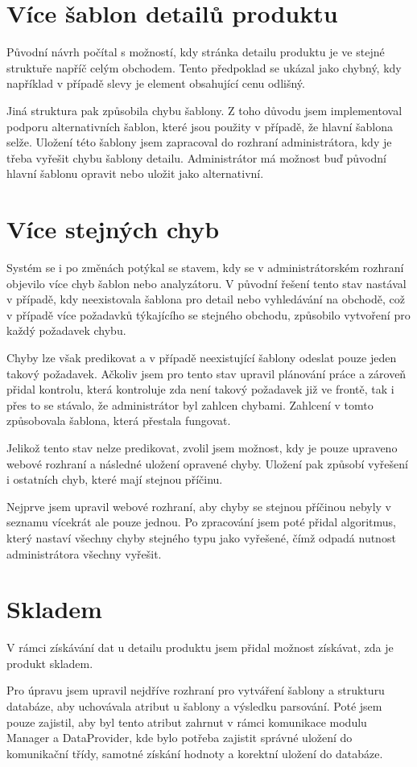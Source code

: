\documentclass[thesis=B,czech]{FITthesis}[2012/06/26]
\begin{document}
\section{Více šablon detailů produktu}
Původní návrh počítal s možností, kdy stránka detailu produktu je ve stejné struktuře napříč celým obchodem.
Tento předpoklad se ukázal jako chybný, kdy například v případě slevy je element obsahující cenu odlišný.
\par
Jiná struktura pak způsobila chybu šablony. Z toho důvodu jsem implementoval podporu alternativních šablon, které jsou
použity v případě, že hlavní šablona selže. Uložení této šablony jsem zapracoval do rozhraní administrátora, kdy je třeba
vyřešit chybu šablony detailu. Administrátor má možnost buď původní hlavní šablonu opravit nebo uložit jako alternativní.

\section{Více stejných chyb}
Systém se i po změnách potýkal se stavem, kdy se v administrátorském rozhraní objevilo více chyb šablon nebo analyzátoru.
V původní řešení tento stav nastával v případě, kdy neexistovala šablona pro detail nebo vyhledávání na obchodě, což v případě více požadavků
týkajícího se stejného obchodu, způsobilo vytvoření pro každý požadavek chybu.
\par
Chyby lze však predikovat a v případě neexistující šablony odeslat pouze jeden takový požadavek. Ačkoliv jsem pro tento 
stav upravil plánování práce a zároveň přidal kontrolu, která kontroluje zda není takový požadavek již ve frontě, tak
i přes to se stávalo, že administrátor byl zahlcen chybami. Zahlcení v tomto způsobovala šablona, která přestala fungovat.
\par
Jelikož tento stav nelze predikovat, zvolil jsem možnost, kdy je pouze upraveno webové rozhraní a následné uložení opravené chyby.
Uložení pak způsobí vyřešení i ostatních chyb, které mají stejnou příčinu.
\par
Nejprve jsem upravil webové rozhraní, aby chyby se stejnou příčinou nebyly v seznamu vícekrát ale pouze jednou. Po zpracování
jsem poté přidal algoritmus, který nastaví všechny chyby stejného typu jako vyřešené, čímž odpadá nutnost administrátora všechny vyřešit.

\section{Skladem}
V rámci získávání dat u detailu produktu jsem přidal možnost získávat, zda je produkt skladem. 
\par
Pro úpravu jsem upravil nejdříve rozhraní pro vytváření šablony a strukturu databáze, aby uchovávala atribut u šablony a výsledku parsování.
Poté jsem pouze zajistil, aby byl tento atribut zahrnut v rámci komunikace modulu Manager a DataProvider, kde bylo potřeba zajistit
správné uložení do komunikační třídy, samotné získání hodnoty a korektní uložení do databáze.
\end{document}
